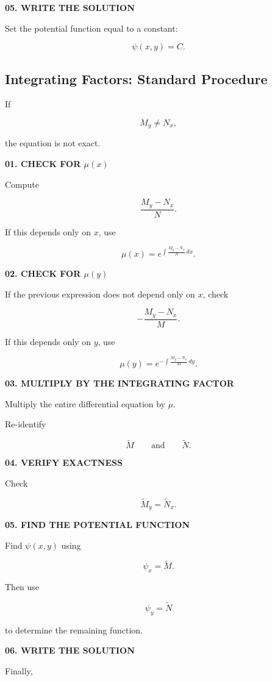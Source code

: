 \documentclass[11pt]{article}
\begin{document}
\textbf{05. WRITE THE SOLUTION}

Set the potential function equal to a constant:

\[
\boxed{\psi(x,y)=C}.
\]

\subsection{Integrating Factors: Standard Procedure}

If

\[
M_y\neq N_x,
\]

the equation is not exact.

\textbf{01. CHECK FOR $\mu(x)$}

Compute

\[
\frac{M_y-N_x}{N}.
\]

If this depends only on $x$, use

\[
\boxed{
\mu(x)
=
e^{\int\frac{M_y-N_x}{N}\,dx}
}.
\]

\textbf{02. CHECK FOR $\mu(y)$}

If the previous expression does not depend only on $x$, check

\[
-\frac{M_y-N_x}{M}.
\]

If this depends only on $y$, use

\[
\boxed{
\mu(y)
=
e^{-\int\frac{M_y-N_x}{M}\,dy}
}.
\]

\textbf{03. MULTIPLY BY THE INTEGRATING FACTOR}

Multiply the entire differential equation by $\mu$.

Re-identify

\[
\widetilde{M}
\qquad\text{and}\qquad
\widetilde{N}.
\]

\textbf{04. VERIFY EXACTNESS}

Check

\[
\widetilde{M}_y=\widetilde{N}_x.
\]

\textbf{05. FIND THE POTENTIAL FUNCTION}

Find $\psi(x,y)$ using

\[
\psi_x=\widetilde{M}.
\]

Then use

\[
\psi_y=\widetilde{N}
\]

to determine the remaining function.

\textbf{06. WRITE THE SOLUTION}

Finally,
\end{document}
